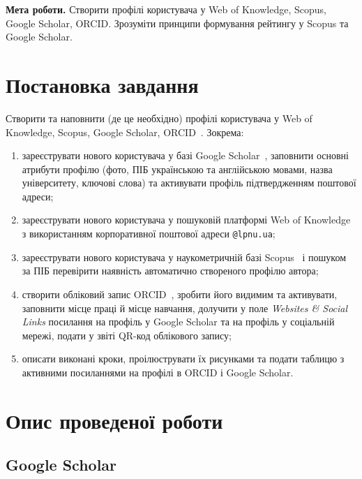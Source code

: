 \documentclass[14pt,a4paper]{extreport}
\begin{document}

\textbf{Мета роботи.} Створити профілі користувача у Web of Knowledge, Scopus, Google Scholar, ORCID. Зрозуміти принципи формування рейтингу у Scopus та Google Scholar.

\section{Постановка завдання}

Створити та наповнити (де це необхідно) профілі користувача у Web of Knowledge, Scopus, Google Scholar, ORCID~\cite{guide}. Зокрема:

\begin{enumerate}
\item зареєструвати нового користувача у базі Google Scholar~\cite{scholar-db}, заповнити основні атрибути профілю (фото, ПІБ українською та англійською мовами, назва університету, ключові слова) та активувати профіль підтвердженням поштової адреси;

\item зареєструвати нового користувача у пошуковій платформі Web of Knowledge~\cite{wos-db} з використанням корпоративної поштової адреси \texttt{@lpnu.ua};

\item зареєструвати нового користувача у наукометричній базі Scopus~\cite{scopus-db} і пошуком за ПІБ перевірити наявність автоматично створеного профілю автора;

\item створити обліковий запис ORCID~\cite{orcid-db}, зробити його видимим та активувати, заповнити місце праці й місце навчання, долучити у поле \textit{Websites \& Social Links} посилання на профіль у Google Scholar та на профіль у соціальній мережі, подати у звіті QR-код облікового запису;

\item описати виконані кроки, проілюструвати їх рисунками та подати таблицю з активними посиланнями на профілі в ORCID і Google Scholar.
\end{enumerate}

\section{Опис проведеної роботи}

\subsection{Google Scholar}
\end{document}
